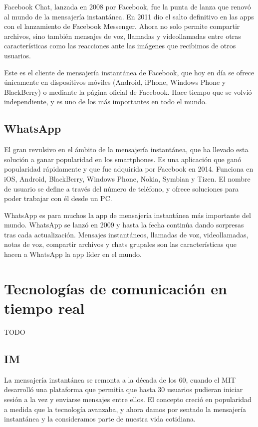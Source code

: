 Facebook Chat, lanzada en 2008 por Facebook, fue la punta de lanza que renovó al mundo de la mensajería instantánea. En 2011 dio el salto definitivo en las apps con el lanzamiento de Facebook Messenger. Ahora no solo permite compartir archivos, sino también mensajes de voz, llamadas y videollamadas entre otras características como las reacciones ante las imágenes que recibimos de otros usuarios.

Este es el cliente de mensajería instantánea de Facebook, que hoy en día se ofrece únicamente en dispositivos móviles (Android, iPhone, Windows Phone y BlackBerry) o mediante la página oficial de Facebook. Hace tiempo que se volvió independiente, y es uno de los más importantes en todo el mundo.

\subsection{WhatsApp}

El gran revulsivo en el ámbito de la mensajería instantánea, que ha llevado esta solución a ganar popularidad en los smartphones. Es una aplicación que ganó popularidad rápidamente y que fue adquirida por Facebook en 2014. Funciona en iOS, Android, BlackBerry, Windows Phone, Nokia, Symbian y Tizen. El nombre de usuario se define a través del número de teléfono, y ofrece soluciones para poder trabajar con él desde un PC.

WhatsApp es para muchos la app de mensajería instantánea más importante del mundo. WhatsApp se lanzó en 2009 y hasta la fecha continúa dando sorpresas tras cada actualización. Mensajes instantáneos, llamadas de voz, videollamadas, notas de voz, compartir archivos y chats grupales son las características que hacen a WhatsApp la app líder en el mundo.

\clearpage

\section{Tecnologías de comunicación en tiempo real}

TODO

\subsection{IM}

La mensajería instantánea se remonta a la década de los 60, cuando el MIT desarrolló una plataforma que permitía que hasta 30 usuarios pudieran iniciar sesión a la vez y enviarse mensajes entre ellos. El concepto creció en popularidad a medida que la tecnología avanzaba, y ahora damos por sentado la mensajería instantánea y la consideramos parte de nuestra vida cotidiana.

